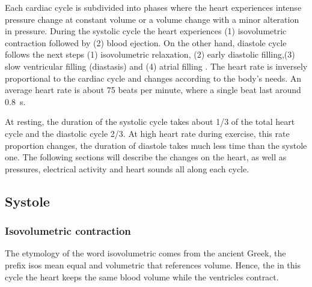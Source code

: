 Each cardiac cycle is subdivided into phases where the heart experiences intense pressure change at constant volume or a volume change with a minor alteration in pressure. During the systolic cycle the heart experiences (1) isovolumetric contraction followed by (2) blood ejection. On the other hand, diastole cycle follows the next steps (1) isovolumetric relaxation, (2) early diastolic filling,(3) slow ventricular filling (diastasis) and (4) atrial filling \cite{fukuta2008cardiac}. The heart rate is inversely proportional to the cardiac cycle and changes according to the body's needs. An average heart rate is about 75 beats per minute, where a single beat last around \SI{0.8}{\second}.

At resting, the duration of the systolic cycle takes about 1/3 of the total heart cycle and the diastolic cycle 2/3. At high heart rate during exercise, this rate proportion changes, the duration of diastole takes much less time than the systole one. The following sections will describe the changes on the heart, as well as pressures, electrical activity and heart sounds all along each cycle.

\subsection{Systole}
\subsubsection{Isovolumetric contraction}
The etymology of the word isovolumetric comes from the ancient Greek, the prefix isos mean equal and volumetric that references volume. Hence, the in this cycle the heart keeps the same blood volume while the ventricles contract.


